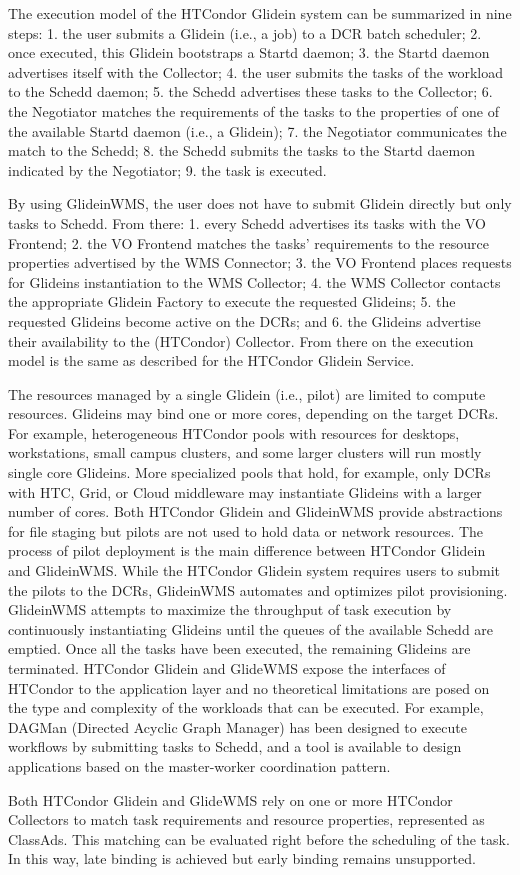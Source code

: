  The execution model of the HTCondor Glidein system can be summarized in nine steps: 1. the user submits a Glidein (i.e., a job) to a DCR batch scheduler; 2. once executed, this Glidein bootstraps a Startd daemon; 3. the Startd daemon advertises itself with the Collector; 4. the user submits the tasks of the workload to the Schedd daemon; 5. the Schedd advertises these tasks to the Collector; 6. the Negotiator matches the requirements of the tasks to the properties of one of the available Startd daemon (i.e., a Glidein); 7. the Negotiator communicates the match to the Schedd; 8. the Schedd submits the tasks to the Startd daemon indicated by
the Negotiator; 9. the task is executed.

By using GlideinWMS, the user does not have to submit Glidein directly but only tasks to Schedd. From there: 1. every Schedd advertises its tasks with the VO Frontend; 2. the VO Frontend matches the tasks’ requirements to the resource properties advertised by the WMS Connector; 3. the VO Frontend places requests for Glideins instantiation to the WMS Collector; 4. the WMS Collector contacts the appropriate Glidein Factory to execute the requested Glideins; 5. the requested Glideins become active on the DCRs; and 6. the Glideins advertise their availability to the (HTCondor) Collector. From there on the execution model is the same as described for the HTCondor Glidein Service.

The resources managed by a single Glidein (i.e., pilot) are limited to compute resources. Glideins may bind one or more cores, depending on the target DCRs. For example, heterogeneous HTCondor pools with resources for desktops, workstations, small campus clusters, and some larger clusters will run mostly single core Glideins. More specialized pools that hold, for example, only DCRs with HTC, Grid, or Cloud middleware may instantiate Glideins with a larger number of cores. Both HTCondor Glidein and GlideinWMS provide abstractions for file staging but pilots are not used to hold data or network resources.
The process of pilot deployment is the main difference between HTCondor Glidein and GlideinWMS. While the
HTCondor Glidein system requires users to submit the pilots to the DCRs, GlideinWMS automates and optimizes pilot provisioning. GlideinWMS attempts to maximize the throughput of task execution by continuously instantiating Glideins until the queues of the available Schedd are emptied. Once all the tasks have been executed, the remaining Glideins are terminated.
HTCondor Glidein and GlideWMS expose the interfaces of HTCondor to the application layer and no theoretical
limitations are posed on the type and complexity of the workloads that can be executed. For example, DAGMan
(Directed Acyclic Graph Manager) has been designed to execute workflows by submitting tasks to Schedd, and a tool is available to design applications based on the master-worker coordination pattern.

Both HTCondor Glidein and GlideWMS rely on one or more HTCondor Collectors to match task requirements and resource properties, represented as ClassAds. This
matching can be evaluated right before the scheduling of the task. In this way, late binding is achieved but early binding remains unsupported.


